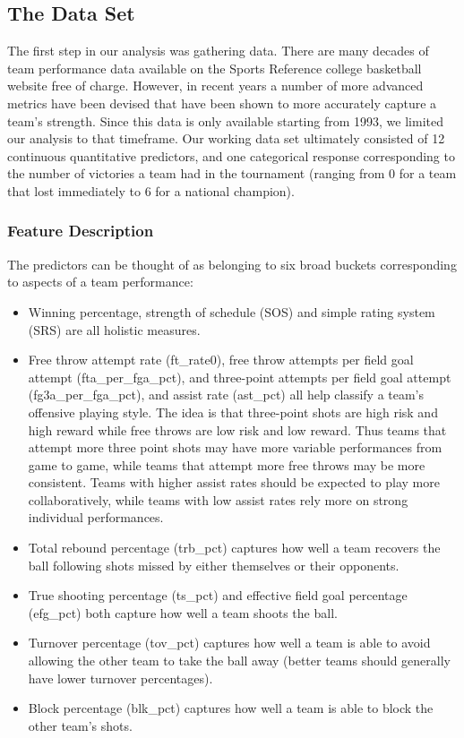 \documentclass[10pt,a4paper, hidelinks]{article} %
\begin{document}
\subsection{The Data Set}

The first step in our analysis was gathering data. There are many decades of team performance data available on the Sports Reference college basketball website free of charge. However, in recent years a number of more advanced metrics have been devised that have been shown to more accurately capture a team's strength. Since this data is only available starting from 1993, we limited our analysis to that timeframe. Our working data set ultimately consisted of 12 continuous quantitative predictors, and one categorical response corresponding to the number of victories a team had in the tournament (ranging from 0 for a team that lost immediately to 6 for a national champion).

\subsubsection{Feature Description}

The predictors can be thought of as belonging to six broad buckets corresponding to aspects of a team performance:

\begin{itemize}
	\item Winning percentage, strength of schedule (SOS) and simple rating system (SRS) are all holistic measures.
	\item Free throw attempt rate (ft\_rate0), free throw attempts per field goal attempt (fta\_per\_fga\_pct), and three-point attempts per field goal attempt (fg3a\_per\_fga\_pct), and assist rate (ast\_pct) all help classify a team's offensive playing style. The idea is that three-point shots are high risk and high reward while free throws are low risk and low reward. Thus teams that attempt more three point shots may have more variable performances from game to game, while teams that attempt more free throws may be more consistent. Teams with higher assist rates should be expected to play more collaboratively, while teams with low assist rates rely more on strong individual performances.
	\item Total rebound percentage (trb\_pct) captures how well a team recovers the ball following shots missed by either themselves or their opponents.
	\item True shooting percentage (ts\_pct) and effective field goal percentage (efg\_pct) both capture how well a team shoots the ball.
	\item Turnover percentage (tov\_pct) captures how well a team is able to avoid allowing the other team to take the ball away (better teams should generally have lower turnover percentages).
	\item Block percentage (blk\_pct)  captures how well a team is able to block the other team's shots.
\end{itemize}
\end{document}
